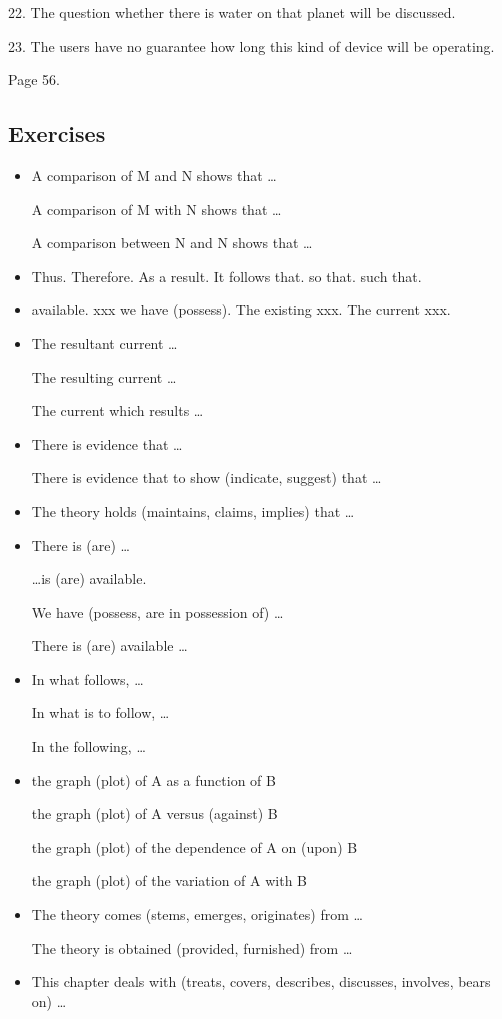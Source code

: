 \documentclass[a4paper,twocolumn,10pt]{article}
\begin{document}
\begin{CJK}{UTF8}{gkai}
	22. The question whether there is water on that planet will be discussed.

	23. The users have no guarantee how long this kind of device will be operating.

	Page 56.

	\subsection{Exercises}

	\begin{itemize}
\item
	A comparison of M and N shows that \ldots

	A comparison of M with N shows that \ldots

	A comparison between N and N shows that \ldots
\item
	Thus. Therefore. As a result. It follows that. so that. such that.
\item
	available. xxx we have (possess). The existing xxx. The current xxx.
\item
	The resultant current \ldots

	The resulting current \ldots

	The current which results \ldots
\item
	There is evidence that \ldots

	There is evidence that to show (indicate, suggest) that \ldots
\item
	The theory holds (maintains, claims, implies) that \ldots
\item
	There is (are) \ldots

	\ldots is (are) available.

	We have (possess, are in possession of) \ldots

	There is (are) available \ldots
\item
	In what follows, \ldots

	In what is to follow, \ldots

	In the following, \ldots
\item
	the graph (plot) of A as a function of B

	the graph (plot) of A versus (against) B

	the graph (plot) of the dependence of A on (upon) B

	the graph (plot) of the variation of A with B
\item
	The theory comes (stems, emerges, originates) from \ldots

	The theory is obtained (provided, furnished) from \ldots
\item
	This chapter deals with (treats, covers, describes, discusses, involves, bears on) \ldots


\end{itemize}
\end{CJK}
\end{document}
